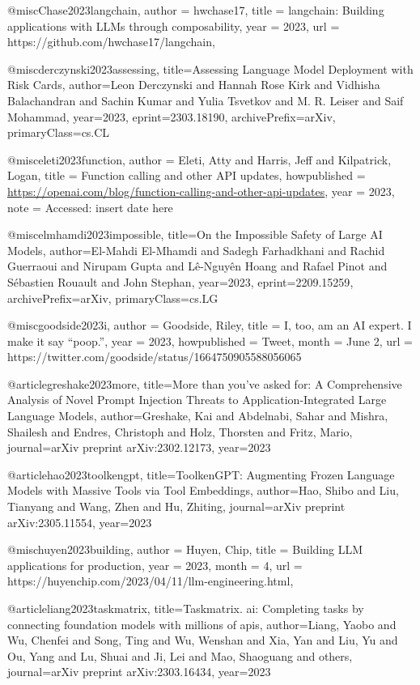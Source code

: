 @misc{Chase2023langchain,
  author = {hwchase17},
  title = {langchain: Building applications with LLMs through composability},
  year = {2023},
  url = {https://github.com/hwchase17/langchain},
}

@misc{derczynski2023assessing,
      title={Assessing Language Model Deployment with Risk Cards},
      author={Leon Derczynski and Hannah Rose Kirk and Vidhisha Balachandran and Sachin Kumar and Yulia Tsvetkov and M. R. Leiser and Saif Mohammad},
      year={2023},
      eprint={2303.18190},
      archivePrefix={arXiv},
      primaryClass={cs.CL}
}

@misc{eleti2023function,
  author = {Eleti, Atty and Harris, Jeff and Kilpatrick, Logan},
  title = {Function calling and other API updates},
  howpublished = {\url{https://openai.com/blog/function-calling-and-other-api-updates}},
  year = {2023},
  note = {Accessed: insert date here}
}

@misc{elmhamdi2023impossible,
      title={On the Impossible Safety of Large AI Models},
      author={El-Mahdi El-Mhamdi and Sadegh Farhadkhani and Rachid Guerraoui and Nirupam Gupta and Lê-Nguyên Hoang and Rafael Pinot and Sébastien Rouault and John Stephan},
      year={2023},
      eprint={2209.15259},
      archivePrefix={arXiv},
      primaryClass={cs.LG}
}

@misc{goodside2023i,
  author = {Goodside, Riley},
  title = {I, too, am an AI expert. I make it say “poop.”},
  year = {2023},
  howpublished = {Tweet},
  month = {June 2},
  url = {https://twitter.com/goodside/status/1664750905588056065}
}

@article{greshake2023more,
  title={More than you've asked for: A Comprehensive Analysis of Novel Prompt Injection Threats to Application-Integrated Large Language Models},
  author={Greshake, Kai and Abdelnabi, Sahar and Mishra, Shailesh and Endres, Christoph and Holz, Thorsten and Fritz, Mario},
  journal={arXiv preprint arXiv:2302.12173},
  year={2023}
}

@article{hao2023toolkengpt,
  title={ToolkenGPT: Augmenting Frozen Language Models with Massive Tools via Tool Embeddings},
  author={Hao, Shibo and Liu, Tianyang and Wang, Zhen and Hu, Zhiting},
  journal={arXiv preprint arXiv:2305.11554},
  year={2023}
}

@misc{huyen2023building,
  author = {Huyen, Chip},
  title = {Building LLM applications for production},
  year = {2023},
  month = {4},
  url = {https://huyenchip.com/2023/04/11/llm-engineering.html},
}

@article{liang2023taskmatrix,
  title={Taskmatrix. ai: Completing tasks by connecting foundation models with millions of apis},
  author={Liang, Yaobo and Wu, Chenfei and Song, Ting and Wu, Wenshan and Xia, Yan and Liu, Yu and Ou, Yang and Lu, Shuai and Ji, Lei and Mao, Shaoguang and others},
  journal={arXiv preprint arXiv:2303.16434},
  year={2023}
}

